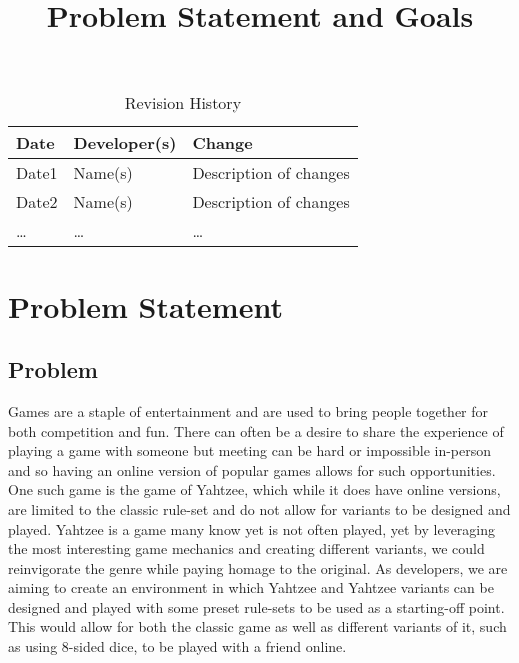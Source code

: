\documentclass{article}
\title{Problem Statement and Goals\\\progname}
\author{\authname}
\date{}
\begin{document}
\maketitle

\begin{table}[hp]
\caption{Revision History} \label{TblRevisionHistory}
\begin{tabularx}{\textwidth}{llX}
\toprule
\textbf{Date} & \textbf{Developer(s)} & \textbf{Change}\\
\midrule
Date1 & Name(s) & Description of changes\\
Date2 & Name(s) & Description of changes\\
\dots & \dots & \dots\\
\bottomrule
\end{tabularx}
\end{table}

\section{Problem Statement}


\subsection{Problem}

Games are a staple of entertainment and are used to bring people together for both competition and fun.
There can often be a desire to share the experience of playing a game with someone but meeting can be hard or impossible in-person and so having an online version of popular games allows for such opportunities.
One such game is the game of Yahtzee, which while it does have online versions, are limited to the classic rule-set and do not allow for variants to be designed and played.
Yahtzee is a game many know yet is not often played, yet by leveraging the most interesting game mechanics and creating different variants, we could reinvigorate the genre while paying homage to the original.
As developers, we are aiming to create an environment in which Yahtzee and Yahtzee variants can be designed and played with some preset rule-sets to be used as a starting-off point. This would allow for both the classic game as well as different variants of it, such as using 8-sided dice, to be played with a friend online.
\end{document}
